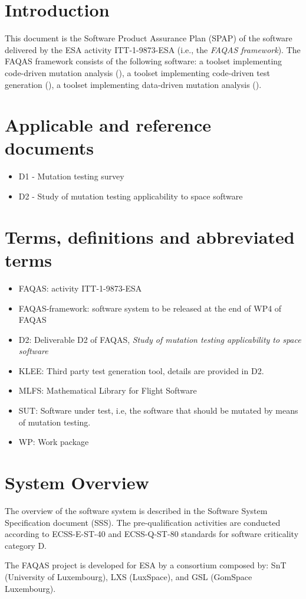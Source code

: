 
\chapter{Introduction}

This document is the Software Product Assurance Plan (SPAP) of the software delivered by the ESA activity ITT-1-9873-ESA (i.e., the \emph{FAQAS framework}).
The FAQAS framework consists of the following software: a toolset  implementing code-driven mutation analysis (\MASS), a toolset implementing code-driven test generation (\SEMUS), a toolset implementing data-driven mutation analysis (\DAMA).

\chapter{Applicable and reference documents}


\begin{itemize}
\item{D1 - Mutation testing survey}
\item{D2 - Study of mutation testing applicability to space software}
\end{itemize}

\chapter{Terms, definitions and abbreviated terms}

\begin{itemize}
\item{FAQAS}: activity ITT-1-9873-ESA
\item{FAQAS-framework}: software system to be released at the end of WP4 of FAQAS
\item{D2}: Deliverable D2 of FAQAS, \emph{Study of mutation testing applicability to space software}
\item{KLEE}: Third party test generation tool, details are provided in D2.
\item{MLFS}: Mathematical Library for Flight Software
\item{SUT}: Software under test, i.e, the software that should be mutated by means of mutation testing.
\item{WP}: Work package

\end{itemize}

\chapter{System Overview}

The overview of the software system is described in the Software System Specification document (SSS).
The pre-qualification activities are conducted according to ECSS-E-ST-40 and ECSS-Q-ST-80 standards for software criticality category D.

The FAQAS project is developed for ESA by a consortium composed by: SnT (University of Luxembourg), LXS (LuxSpace), and GSL (GomSpace Luxembourg).
\clearpage
